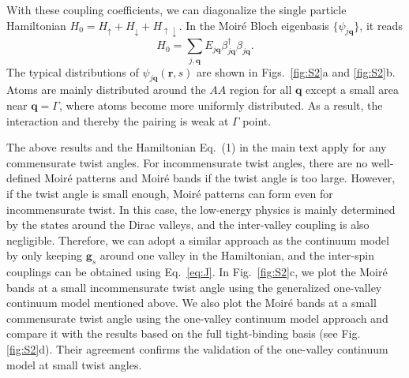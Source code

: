 \documentclass[twocolumn,english,prl,floatfix,citeautoscript,nofootinbib]{revtex4}
\begin{document}
\begin{widetext}
With these coupling coefficients, we can diagonalize the single particle
Hamiltonian $H_{0}=H_{\uparrow }+H_{\downarrow }+H_{\uparrow \downarrow }$.
In the Moir\'{e} Bloch eigenbasis $\{\psi _{j\mathbf{q}}\}$, it reads
\begin{equation}
H_{0}=\sum_{j,\mathbf{q}}E_{j\mathbf{q}}\beta _{j\mathbf{q}}^{\dag }\beta _{j%
\mathbf{q}}.
\end{equation}%
The typical distributions of $\psi _{j\mathbf{q}}(\mathbf{r},s)$ are shown
in Figs.~\ref{fig:S2}a and \ref{fig:S2}b. Atoms are mainly distributed
around the $AA$ region for all $\mathbf{q}$ except a small area near $%
\mathbf{q}=\Gamma $, where atoms become more uniformly distributed. As a
result, the interaction and thereby the pairing is weak at $\Gamma $ point.

The above results and the Hamiltonian Eq.~(1) in the main text apply for any
commensurate twist angles. For incommensurate twist angles, there are no
well-defined Moir\'{e} patterns and Moir\'{e} bands if the twist angle is
too large. However, if the twist angle is small enough, Moir\'{e} patterns
can form even for incommensurate twist. In this case, the low-energy physics
is mainly determined by the states around the Dirac valleys, and the
inter-valley coupling is also negligible. Therefore, we can adopt a similar
approach as the continuum model by only keeping $\mathbf{g}_{s}$ around one
valley in the Hamiltonian, and the inter-spin couplings can be obtained
using Eq.~\ref{eq:J}. In Fig.~\ref{fig:S2}c, we plot the Moir\'{e} bands at
a small incommensurate twist angle using the generalized one-valley
continuum model mentioned above. We also plot the Moir\'{e} bands at a small
commensurate twist angle using the one-valley continuum model approach and
compare it with the results based on the full tight-binding basis (see Fig.~%
\ref{fig:S2}d). Their agreement confirms the validation of the one-valley
continuum model at small twist angles.



\end{widetext}
\end{document}
